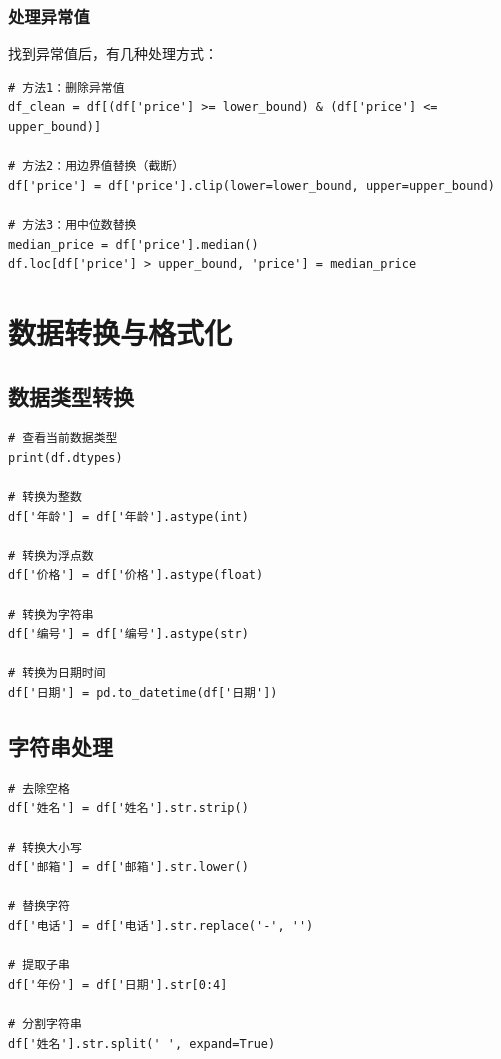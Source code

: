 \documentclass[12pt,a4paper]{article}
\begin{document}
\subsubsection{处理异常值}

找到异常值后，有几种处理方式：

\begin{lstlisting}[caption={处理异常值的方法}]
# 方法1：删除异常值
df_clean = df[(df['price'] >= lower_bound) & (df['price'] <= upper_bound)]

# 方法2：用边界值替换（截断）
df['price'] = df['price'].clip(lower=lower_bound, upper=upper_bound)

# 方法3：用中位数替换
median_price = df['price'].median()
df.loc[df['price'] > upper_bound, 'price'] = median_price
\end{lstlisting}

\section{数据转换与格式化}

\subsection{数据类型转换}

\begin{lstlisting}[caption={转换数据类型}]
# 查看当前数据类型
print(df.dtypes)

# 转换为整数
df['年龄'] = df['年龄'].astype(int)

# 转换为浮点数
df['价格'] = df['价格'].astype(float)

# 转换为字符串
df['编号'] = df['编号'].astype(str)

# 转换为日期时间
df['日期'] = pd.to_datetime(df['日期'])
\end{lstlisting}

\subsection{字符串处理}

\begin{lstlisting}[caption={常用字符串方法}]
# 去除空格
df['姓名'] = df['姓名'].str.strip()

# 转换大小写
df['邮箱'] = df['邮箱'].str.lower()

# 替换字符
df['电话'] = df['电话'].str.replace('-', '')

# 提取子串
df['年份'] = df['日期'].str[0:4]

# 分割字符串
df['姓名'].str.split(' ', expand=True)
\end{lstlisting}
\end{document}

